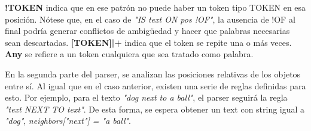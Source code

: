 \textbf{!TOKEN} indica que en ese patr\'on no puede haber un token tipo TOKEN en esa posici\'on. N\'otese que, en el caso de \textit{"IS text ON pos !OF"}, la ausencia de !OF al final podría generar conflictos de ambigüedad y hacer que palabras necesarias sean descartadas. \textbf{[TOKEN]|+} indica que el token se repite una o m\'as veces. \textbf{Any} se refiere a un token cualquiera que sea tratado como palabra.

En la segunda parte del parser, se analizan las posiciones relativas de los objetos entre sí. Al igual que en el caso anterior, existen una serie de reglas definidas para esto. Por ejemplo, para el texto \textit{"dog next to a ball"}, el parser seguirá la regla \textit{"text NEXT TO text"}. De esta forma, se espera obtener un text con string igual a \textit{"dog"}, \textit{neighbors["next"] = "a ball"}.

